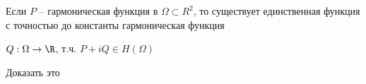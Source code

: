 \begin{remark}\thmslashn
	
	Если $P$ -- гармоническая функция в $\Omega \subset R^2$, то существует единственная функция с точностью до константы гармоническая функция 
	
	$Q:\Omega \to \R$, т.ч. $P + iQ \in H(\Omega)$
	
\end{remark}

\begin{exerc}
	Доказать это 
\end{exerc}

